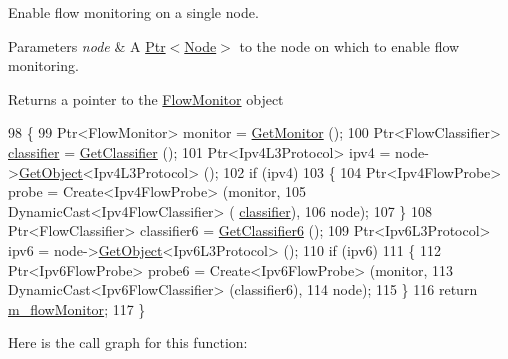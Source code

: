 Enable flow monitoring on a single node. 


\begin{DoxyParams}{Parameters}
{\em node} & A \hyperlink{classns3_1_1Ptr}{Ptr$<$\+Node$>$} to the node on which to enable flow monitoring. \\
\hline
\end{DoxyParams}
\begin{DoxyReturn}{Returns}
a pointer to the \hyperlink{classns3_1_1FlowMonitor}{Flow\+Monitor} object 
\end{DoxyReturn}

\begin{DoxyCode}
98 \{
99   Ptr<FlowMonitor> monitor = \hyperlink{classns3_1_1FlowMonitorHelper_aa250a2bd2fe270cd743caf1cce482a86}{GetMonitor} ();
100   Ptr<FlowClassifier> \hyperlink{design_8txt_af9e6b398b148789960232a87c72a107e}{classifier} = \hyperlink{classns3_1_1FlowMonitorHelper_a60084e694545354136fed3ce93de00ae}{GetClassifier} ();
101   Ptr<Ipv4L3Protocol> ipv4 = node->\hyperlink{classns3_1_1Object_a13e18c00017096c8381eb651d5bd0783}{GetObject}<Ipv4L3Protocol> ();
102   \textcolor{keywordflow}{if} (ipv4)
103     \{
104       Ptr<Ipv4FlowProbe> probe = Create<Ipv4FlowProbe> (monitor,
105                                                         DynamicCast<Ipv4FlowClassifier> (
      \hyperlink{design_8txt_af9e6b398b148789960232a87c72a107e}{classifier}),
106                                                         node);
107     \}
108   Ptr<FlowClassifier> classifier6 = \hyperlink{classns3_1_1FlowMonitorHelper_a4be2bf1ce8fc4d8e646e3bc77994f606}{GetClassifier6} ();
109   Ptr<Ipv6L3Protocol> ipv6 = node->\hyperlink{classns3_1_1Object_a13e18c00017096c8381eb651d5bd0783}{GetObject}<Ipv6L3Protocol> ();
110   \textcolor{keywordflow}{if} (ipv6)
111     \{
112       Ptr<Ipv6FlowProbe> probe6 = Create<Ipv6FlowProbe> (monitor,
113                                                          DynamicCast<Ipv6FlowClassifier> (classifier6),
114                                                          node);
115     \}
116   \textcolor{keywordflow}{return} \hyperlink{classns3_1_1FlowMonitorHelper_adabd8f957790154f8b40da80833c1954}{m\_flowMonitor};
117 \}
\end{DoxyCode}


Here is the call graph for this function\+:


